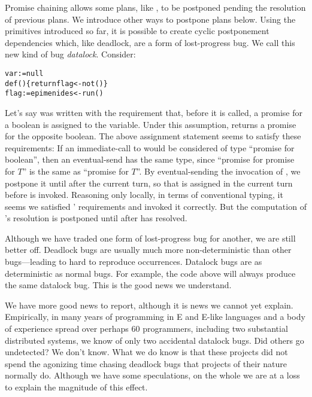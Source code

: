 \documentclass{llncs}
\begin{document}
Promise chaining allows some plans, like , to be postponed
pending the resolution of previous plans. We introduce other ways to
postpone plans below.  Using the primitives introduced so far, it is
possible to create cyclic postponement dependencies which, like
deadlock, are a form of lost-progress bug. We call this new kind of
bug \emph{datalock}. Consider:
%
\begin{alltt}
    var  := null
    def () \{ return flag <- not() \}
    flag := epimenides <- run()
\end{alltt}
%
Let's say  was written with the requirement that,
before it is called, a promise for a boolean is assigned to the
 variable. Under this assumption,  returns a
promise for the opposite boolean. The above assignment statement seems
to satisfy these requirements: If an immediate-call to
 would be considered of type ``promise for boolean'',
then an eventual-send has the same type, since ``promise for promise
for $T$'' is the same as ``promise for $T$''. By eventual-sending the
invocation of , we postpone it until after the current
turn, so that  is assigned in the current turn before
 is invoked. Reasoning only locally, in terms of
conventional typing, it seems we satisfied '
requirements and invoked it correctly. But the computation of
's resolution is postponed until after  has
resolved. 

Although we have traded one form of lost-progress bug for another, we
are still better off. Deadlock bugs are usually much more
non-deterministic than other bugs---leading to hard to reproduce
occurrences. Datalock bugs are as deterministic as normal
bugs.  For example, the code above will always
produce the same datalock bug. This is the good news we understand.

We have more good news to report, although it is news we cannot yet
explain. Empirically, in many years of programming in E and E-like
languages and a body of experience spread over perhaps 60 programmers,
including two substantial distributed systems, we know of only two
accidental datalock bugs. Did others go undetected? We don't
know. What we do know is that these projects did not spend the
agonizing time chasing deadlock bugs that projects of their nature
normally do. Although we have some speculations, on the whole we are
at a loss to explain the magnitude of this effect.
\end{document}
